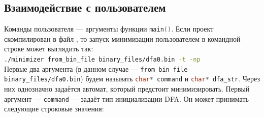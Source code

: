 \documentclass{article}
\begin{document}
\subsection{Взаимодействие с пользователем}
Команды пользователя --- аргументы функции \lstinline[language=C++]!main()!. Если проект скомпилирован в файл , то запуск минимизации пользователем в командной строке может выглядить так:\\
 \lstinline[language=bash]!./minimizer from_bin_file binary_files/dfa0.bin -t -np!\\
 Первые два аргумента (в данном случае --- \lstinline[language=bash]!from_bin_file binary_files/dfa0.bin!) будем называть \lstinline[language=C++]!char* command! и \lstinline[language=C++]!char* dfa_str!. Через них однозначно задаётся автомат, который предстоит минимизировать. Первый аргумент --- \lstinline[language=C++]!command! --- задаёт тип инициализации DFA. Он может принимать следующие строковые значения:
\end{document}
